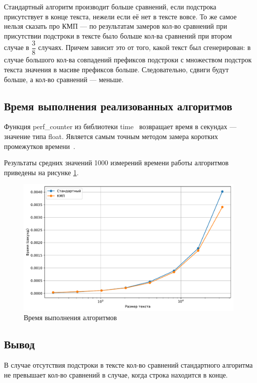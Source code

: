 Стандартный алгоритм производит больше сравнений, если подстрока присутствует в конце текста, нежели если её нет в тексте вовсе.
То же самое нельзя сказать про КМП --- по результатам замеров кол-во сравнений при присутствии подстроки в тексте было больше кол-ва сравнений при втором случае в $\dfrac{3}{8}$ случаях.
Причем зависит это от того, какой текст был сгенерирован: в случае большого кол-ва совпадений префиксов подстроки с множеством подстрок текста значения в масиве префиксов больше.
Следовательно, сдвиги будут больше, а кол-во сравнений --- меньше.

\subsection{Время выполнения реализованных алгоритмов}
Функция perf\_counter из библиотеки time~\cite{time} возвращает время в секундах --- значение типа float.
Является самым точным методом замера коротких промежутков времени~\cite{perf}.

Результаты средних значений 1000 измерений времени работы алгоритмов приведены на рисунке \ref{fig:results}.
\begin{figure}
	\centering
	\includegraphics[width=1\linewidth]{../src/lab_07/results_logscale}
	\caption{Время выполнения алгоритмов}
	\label{fig:results}
\end{figure}


\subsection*{Вывод}
В случае отсутствия подстроки в тексте кол-во сравнений стандартного алгоритма не превышает кол-во сравнений в случае, когда строка находится в конце.

